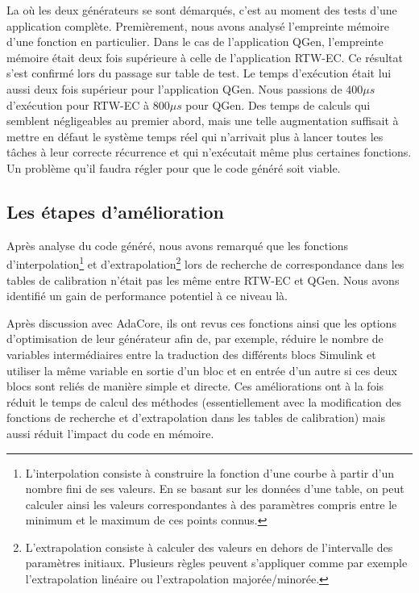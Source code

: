 La où les deux générateurs se sont démarqués, c'est au moment des tests d'une
application complète. Premièrement, nous avons analysé l'empreinte mémoire
d'une fonction en particulier. Dans le cas de l'application QGen, l'empreinte
mémoire était deux fois supérieure à celle de l'application
RTW-EC\up{\circledR}. Ce résultat s'est confirmé lors du passage sur table de
test. Le temps d'exécution était lui aussi deux fois supérieur pour
l'application QGen. Nous passions de $400\mu{}s$ d'exécution pour
RTW-EC\up{\circledR} à $800\mu{}s$ pour QGen.  Des temps de calculs qui semblent
négligeables au premier abord, mais une telle augmentation suffisait à mettre en
défaut le système temps réel qui n'arrivait plus à lancer toutes les tâches à
leur correcte récurrence et qui n'exécutait même plus certaines fonctions. Un
problème qu'il faudra régler pour que le code généré soit viable.

\subsection{Les étapes d'amélioration}
Après analyse du code généré, nous avons remarqué que les fonctions
d'interpolation\footnote{L'interpolation consiste à construire la fonction d'une
courbe à partir d'un nombre fini de ses valeurs. En se basant sur les données
d'une table, on peut calculer ainsi les valeurs correspondantes à des paramètres
compris entre le minimum et le maximum de ces points connus.} et
d'extrapolation\footnote{L'extrapolation consiste à calculer des valeurs en
dehors de l'intervalle des paramètres initiaux. Plusieurs règles peuvent
s'appliquer comme par exemple l'extrapolation linéaire ou l'extrapolation
majorée/minorée.} lors de recherche de correspondance dans les tables de
calibration n'était pas les même entre RTW-EC\up{\circledR} et QGen. Nous avons
identifié un gain de performance potentiel à ce niveau là.

Après discussion avec AdaCore, ils ont revus ces fonctions ainsi que les options
d'optimisation de leur générateur afin de, par exemple, réduire le nombre de
variables intermédiaires entre la traduction des différents blocs
Simulink\up{\circledR} et utiliser la même variable en sortie d'un bloc et en
entrée d'un autre si ces deux blocs sont reliés de manière simple et directe.
Ces améliorations ont à la fois réduit le temps de calcul des méthodes
(essentiellement avec la modification des fonctions de recherche et
d'extrapolation dans les tables de calibration) mais aussi réduit l'impact du
code en mémoire.

